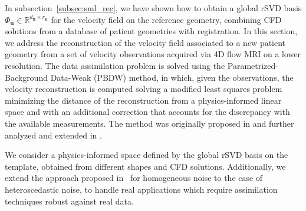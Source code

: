 In subsection~\ref{subsec:sml_rec}, we have shown how to obtain a global rSVD basis $\Phi_{\mathbf u}\in\mathbb{R}^{d_{\mathbf u}\times r_{\mathbf u}}$ for the velocity field on the reference geometry, combining CFD solutions from a database of patient geometries with registration. 
In this section, we address the reconstruction of the velocity field associated to a new patient geometry from a set of velocity observations acquired via 4D flow MRI on a lower resolution.
%
The data assimilation problem is solved using the Parametrized-Background Data-Weak (PBDW) method, in which, given the observations,
the velocity reconstruction is computed solving a modified least squares problem minimizing the distance of the reconstruction from a physics-informed
linear space and with an additional correction that accounts for the discrepancy with the available measurements.
The method was originally proposed in \cite{MPPY2015} and further analyzed and extended in \cite{cohen2022_nonlinearSpaces,gong2019pbdw}. 

We consider a physics-informed space defined by the global rSVD basis on the template, obtained from different shapes and CFD solutions. Additionally, we extend the approach 
proposed in~\cite{gong2019pbdw} for homogeneous noise to the case of heteroscedastic noise, to handle real applications which require assimilation techniques robust against real data.




